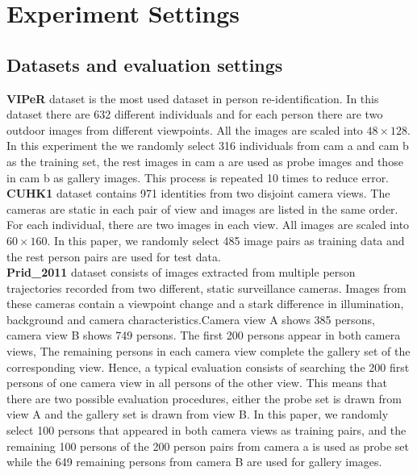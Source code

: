 \chapter{Experiment Settings}


\section{Datasets and evaluation settings}

\noindent \textbf{VIPeR} dataset is the most used dataset in person re-identification. In this dataset there are 632 different individuals and for each person there are two outdoor images from different viewpoints. All the images are scaled into $48\times128$. In this experiment the we randomly select 316 individuals from cam a and cam b as the training set, the rest images in cam a are used as probe images and those in cam b as gallery images. This process is repeated 10 times to reduce error.\\
\textbf{CUHK1} dataset contains 971 identities from two disjoint camera views. The cameras are static in each pair of view and images are listed in the same order. For each individual, there are two images in each view. All images are scaled into $60\times160$. In this paper, we randomly select 485 image pairs as training data and the rest person pairs are used for test data. \\
\textbf{Prid\_2011} dataset consists of images extracted from multiple person trajectories recorded from two different, static surveillance cameras. Images from these cameras contain a viewpoint change and a stark difference in illumination, background and camera characteristics.Camera view A shows 385 persons, camera view B shows 749 persons. The first 200 persons appear in both camera views, The remaining persons in each camera view complete the gallery set of the corresponding view. Hence, a typical evaluation consists of searching the 200 first persons of one camera view in all persons of the other view. This means that there are two possible evaluation procedures, either the probe set is drawn from view A and the gallery set is drawn from view B. In this paper, we randomly select 100 persons that appeared in both camera views as training pairs, and the remaining 100 persons of the 200 person pairs from camera a is used as probe set while the 649 remaining persons from camera B are used for gallery images. \\
